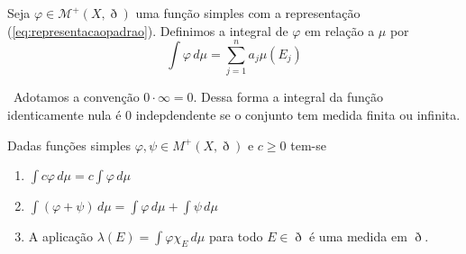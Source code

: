 \documentclass[a4paper, 11pt]{book}
\theoremstyle{definition}
\newcommand{\obs}{\noindent{\textbf{\textcolor{black}{\sffamily Observação:}}}~}
\newcommand{\cM}{\mathcal{M}}
\begin{document}
\begin{dbox}
    Seja $\varphi \in \cM^+(X,\eth)$ uma função simples com a representação (\ref{eq:representacaopadrao}). Definimos a integral de $\varphi$ em relação a $\mu$ por
    \begin{equation*}
        \int \varphi \, d\mu = \sum_{j=1}^n a_j \mu(E_j)
    \end{equation*}
\end{dbox}

\obs Adotamos a convenção $0 \cdot \infty = 0$. Dessa forma a integral da função identicamente nula é $0$ indepdendente se o conjunto tem medida finita ou infinita.

\begin{lbox} \label{lm:propriedades-elementares-simples}
    Dadas funções simples $\varphi, \psi \in M^+(X, \eth)$ e $c \geqslant 0$ tem-se
    \begin{enumerate}[leftmargin=*, label=\textbf{(\alph*)}]
        \item $\displaystyle \int c \varphi \, d\mu = c \int \varphi \, d\mu$
        \item $\displaystyle \int (\varphi + \psi) \, d\mu = \int \varphi \,d\mu + \int \psi \, d\mu$
        \item A aplicação
        $\displaystyle \lambda(E) = \int \varphi \chi_E \, d\mu$
        para todo $E \in \eth$ é uma medida em $\eth$.
    \end{enumerate}
\end{lbox}
\end{document}
